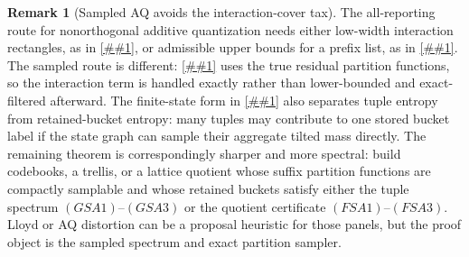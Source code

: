 \documentclass[10pt]{article}
\newcommand{\cref}[1]{\ref{##1}}
\theoremstyle{definition}
\newtheorem{remark}[theorem]{Remark}
\begin{document}
\begin{remark}[Sampled AQ avoids the interaction-cover tax]
   \label{rem:sampled-aq-interaction}
   The all-reporting route for nonorthogonal additive quantization needs
   either low-width interaction rectangles, as in
   \cref{prop:rectangular-interaction-cover-aq}, or admissible upper bounds
   for a prefix list, as in \cref{lem:priced-prefix-additive-ivf-reporter}.
   The sampled route is different: \cref{lem:gibbs-prefix-additive-ivf-sampler}
   uses the true residual partition functions, so the interaction term is
   handled exactly rather than lower-bounded and exact-filtered afterward.
   The finite-state form in \cref{lem:gibbs-aq-state-quotient} also separates
   tuple entropy from retained-bucket entropy: many tuples may contribute to
   one stored bucket label if the state graph can sample their aggregate tilted
   mass directly.  The remaining theorem is correspondingly sharper and more
   spectral: build codebooks, a trellis, or a lattice quotient whose suffix
   partition functions are compactly samplable and whose retained buckets
   satisfy either the tuple spectrum \((GSA1)\)--\((GSA3)\) or the quotient
   certificate \((FSA1)\)--\((FSA3)\).  Lloyd or AQ distortion can be a
   proposal heuristic for those panels, but the proof object is the sampled
   spectrum and exact partition sampler.
\end{remark}
\end{document}
